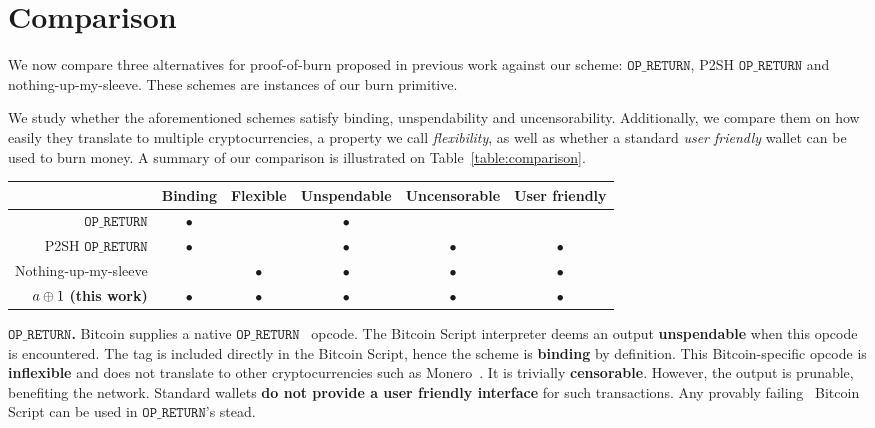 \section{Comparison}
\newcommand{\opreturn}{\texttt{OP\_RETURN}}

We now compare three alternatives for proof-of-burn proposed in previous work against our scheme: $\opreturn$, P2SH $\opreturn$ and nothing-up-my-sleeve. These schemes are instances of our burn primitive.

We study whether the aforementioned schemes satisfy binding, unspendability and uncensorability. Additionally, we compare them on how easily they translate to multiple cryptocurrencies, a property we call \emph{flexibility}, as well as whether a standard \emph{user friendly} wallet can be used to burn money. A summary of our comparison is illustrated on Table~\ref{table:comparison}.

\begin{table*}[t]
    \newcommand{\y}{$\bullet$}
    \newcommand{\n}{}
    \centering
    \caption{Comparison between proof-of-burn schemes.\label{table:comparison}}

    \begin{tabular}{ |r|c|c|c|c|c| }
     \hline
                                        & Binding & Flexible & Unspendable & Uncensorable & User friendly \\
     \hline
     $\opreturn$                        & \y      & \n       & \y          & \n & \n \\
     P2SH $\opreturn$                   & \y      & \n       & \y          & \y & \y \\
     Nothing-up-my-sleeve               & \n      & \y       & \y          & \y & \y \\
     $a \oplus 1$ \textbf{(this work)}    & \y      & \y       & \y          & \y & \y \\
     \hline
    \end{tabular}
\end{table*}

\noindent
\textbf{$\opreturn$.}
Bitcoin supplies a native $\opreturn$~\cite{bartoletti2017analysis} opcode.
The Bitcoin Script interpreter deems an output \textbf{unspendable} when this opcode is encountered.
The tag is included directly in the Bitcoin Script, hence the scheme is \textbf{binding} by definition.
This Bitcoin-specific opcode is \textbf{inflexible} and does not translate to other cryptocurrencies such as Monero~\cite{van2013cryptonote}.
It is trivially \textbf{censorable}.
However, the output is prunable, benefiting the network.
Standard wallets \textbf{do not provide a user friendly interface} for such transactions.
Any provably failing~\cite{stewart} Bitcoin Script can be used in $\opreturn$'s stead.

